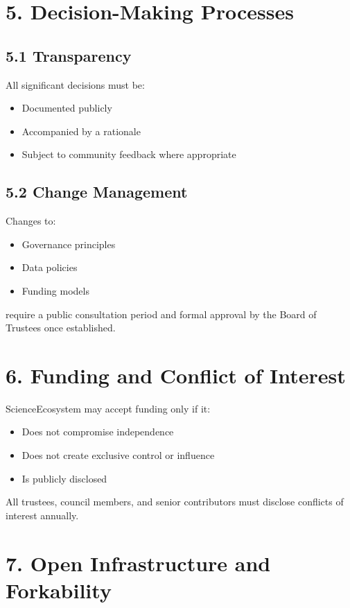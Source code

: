\section*{5. Decision-Making Processes}

\subsection*{5.1 Transparency}

All significant decisions must be:
\begin{itemize}
    \item Documented publicly
    \item Accompanied by a rationale
    \item Subject to community feedback where appropriate
\end{itemize}

\subsection*{5.2 Change Management}

Changes to:
\begin{itemize}
    \item Governance principles
    \item Data policies
    \item Funding models
\end{itemize}

require a public consultation period and formal approval by the Board of Trustees once established.

\section*{6. Funding and Conflict of Interest}

ScienceEcosystem may accept funding only if it:
\begin{itemize}
    \item Does not compromise independence
    \item Does not create exclusive control or influence
    \item Is publicly disclosed
\end{itemize}

All trustees, council members, and senior contributors must disclose conflicts of interest annually.

\section*{7. Open Infrastructure and Forkability}

